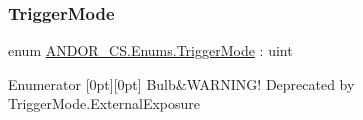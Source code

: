 \subsubsection{\texorpdfstring{Trigger\+Mode}{TriggerMode}}
{\footnotesize\ttfamily enum \hyperlink{namespace_a_n_d_o_r___c_s_1_1_enums_abd5128a32e1bcfb6ccfc0b5214f83ef6}{A\+N\+D\+O\+R\+\_\+\+C\+S.\+Enums.\+Trigger\+Mode} \+: uint\hspace{0.3cm}{\ttfamily [strong]}}

\begin{DoxyEnumFields}{Enumerator}
[0pt][0pt]{}\mbox{\label{namespace_a_n_d_o_r___c_s_1_1_enums_abd5128a32e1bcfb6ccfc0b5214f83ef6a2b56dc3133a0b7e566a1371db3e7cff8}} 
Bulb&W\+A\+R\+N\+I\+N\+G! Deprecated by Trigger\+Mode.\+External\+Exposure \\
\hline

\end{DoxyEnumFields}
